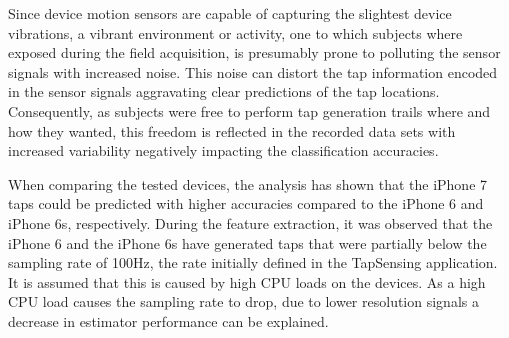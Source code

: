 
Since device motion sensors are capable of capturing the slightest device vibrations, a vibrant environment or activity, one to which subjects where exposed during the field acquisition, is presumably prone to polluting the sensor signals with increased noise. This noise can distort the tap information encoded in the sensor signals aggravating clear predictions of the tap locations. Consequently, as subjects were free to perform tap generation trails where and how they wanted, this freedom is reflected in the recorded data sets with increased variability negatively impacting the classification accuracies.

When comparing the tested devices, the analysis has shown that the iPhone 7 taps could be predicted with higher accuracies compared to the iPhone 6 and iPhone 6s, respectively. During the feature extraction, it was observed that the iPhone 6 and the iPhone 6s have generated taps that were partially below the sampling rate of 100Hz, the rate initially defined in the TapSensing application. It is assumed that this is caused by high CPU loads on the devices. As a high CPU load causes the sampling rate to drop, due to lower resolution signals a decrease in estimator performance can be explained.

